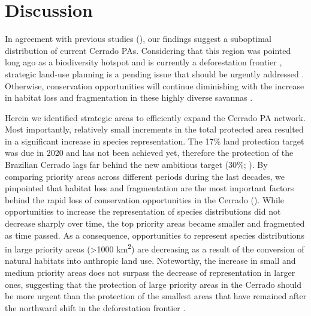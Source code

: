 \documentclass[12pt,openright,oneside,a4paper,english]{abntex2}
\begin{document}
\section{Discussion}

In agreement with previous studies (\citealp[e.g.][]{PrietoTorres2020, PrietoTorres2022}), our findings suggest a suboptimal distribution of current Cerrado PAs. Considering that this region was pointed long ago as a biodiversity hotspot \citep{Myers2000} and is currently a deforestation frontier \citep{Pacheco2021}, strategic land-use planning is a pending issue that should be urgently addressed \citep{Strassburg2017, Lemes2020}. Otherwise, conservation opportunities will continue diminishing with the increase in habitat loss and fragmentation in these highly diverse savannas \citep{Nori2013, Resende2019}.

Herein we identified strategic areas to efficiently expand the Cerrado PA network. Most importantly, relatively small increments in the total protected area resulted in a significant increase in species representation. The 17\% land protection target was due in 2020 \citep{CBD2010} and has not been achieved yet, therefore the protection of the Brazilian Cerrado lags far behind the new ambitious target (30\%; \citealp{Woodley2019}). By comparing priority areas across different periods during the last decades, we pinpointed that habitat loss and fragmentation are the most important factors behind the rapid loss of conservation opportunities in the Cerrado (\citealp[see also][]{Grande2020}). While opportunities to increase the representation of species distributions did not decrease sharply over time, the top priority areas became smaller and fragmented as time passed. As a consequence, opportunities to represent species distributions in large priority areas (>1000 km\textsuperscript{2}) are decreasing as a result of the conversion of natural habitats into anthropic land use. Noteworthy, the increase in small and medium priority areas does not surpass the decrease of representation in larger ones, suggesting that the protection of large priority areas in the Cerrado should be more urgent than the protection of the smallest areas that have remained after the northward shift in the deforestation frontier \citep{Betts2017, deMarcoJr2020}.
\end{document}

